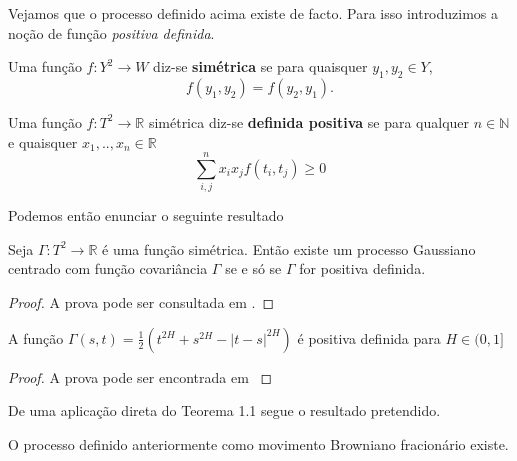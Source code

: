 \documentclass{article}
\begin{document}
\vspace{0.5cm}

Vejamos que o processo definido acima existe de facto. Para isso introduzimos a noção de função \textit{positiva definida}.

\vspace{0.5cm}

\begin{dfn}
    Uma função $f:Y^2 \rightarrow W$ diz-se \textbf{simétrica} se para quaisquer $y_1,y_2 \in Y$, $$f(y_1,y_2)=f(y_2,y_1).$$
    
    Uma função $f: T^2 \rightarrow \mathbb{R} $ simétrica diz-se \textbf{definida positiva} se para qualquer $n \in \mathbb{N}$ e  quaisquer $x_1,..,x_n \in \mathbb{R}$
    \begin{equation*}
        \sum_{i,j}^nx_ix_jf(t_i,t_j) \geq 0
    \end{equation*}
\end{dfn}

\vspace{0.5cm}
Podemos então enunciar o seguinte resultado
\vspace{0.5cm}

\begin{thm}[Kolmogorov] Seja $\Gamma:T^2 \rightarrow \mathbb{R}$ é uma função simétrica. Então existe um processo Gaussiano centrado com função covariância $\Gamma$ se e só se $\Gamma$ for positiva definida.
\end{thm}
\begin{proof}
    A prova pode ser consultada em \cite{RevuzYor1999}.
\end{proof}
\vspace{0.5cm}

\begin{prop}
A função $\Gamma(s,t)=\frac{1}{2}(t^{2H}+s^{2H}-|t-s|^{2H})$ é positiva definida para $H\in (0,1]$
\end{prop}
\begin{proof}
    A prova pode ser encontrada em \cite{Nourdin2012}
\end{proof}
\vspace{0.5cm}

\noindent De uma aplicação direta do Teorema 1.1 segue o resultado pretendido.

\vspace{0.5cm}

\begin{cor}O processo definido anteriormente como movimento Browniano fracionário existe.
\end{cor}
\end{document}
